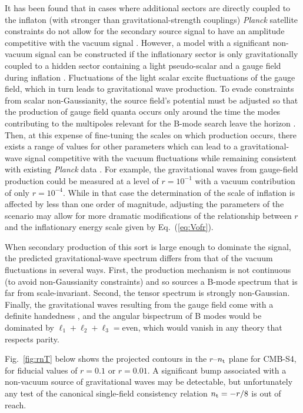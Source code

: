 It has been found that in cases where additional sectors are directly coupled to the inflaton (with stronger than gravitational-strength couplings) {\it Planck\/} satellite constraints do not allow for the secondary source signal to have an amplitude competitive with the vacuum signal \cite{Ozsoy:2014sba,Mirbabayi:2014jqa}. However, a model with a significant non-vacuum signal can be constructed if the inflationary sector is only gravitationally coupled to a hidden sector containing a light pseudo-scalar and a gauge field during inflation \cite{Barnaby:2012xt,Peloso:2016gqs}. Fluctuations of the light scalar excite fluctuations of the gauge field, which in turn leads to gravitational wave production. To evade constraints from scalar non-Gaussianity, the source field's potential must be adjusted so that the production of gauge field quanta occurs only around the time the modes contributing to the multipoles relevant for the B-mode search leave the horizon \cite{Namba:2015gja}. Then, at this expense of fine-tuning the scales on which production occurs, there exists a range of values for other parameters which can lead to a gravitational-wave signal competitive with the vacuum fluctuations while remaining consistent with existing {\it Planck\/} data \cite{Namba:2015gja,Peloso:2016gqs}. For example, the gravitational waves from gauge-field production could be measured at a level of $r=10^{-1}$ with a vacuum contribution of only $r=10^{-4}$. While in that case the determination of the scale of inflation is affected by less than one order of magnitude, adjusting the parameters of the scenario may allow for more dramatic modifications of the relationship between $r$ and the inflationary energy scale given by Eq.~(\ref{eq:Vofr}). 

When secondary production of this sort is large enough to dominate the signal, the predicted gravitational-wave spectrum differs from that of the vacuum fluctuations in several ways. First, the production mechanism is not continuous (to avoid non-Gaussianity constraints) and so sources a B-mode spectrum that is far from scale-invariant. Second, the tensor spectrum is strongly non-Gaussian. Finally, the gravitational waves resulting from the gauge field come with a definite handedness \cite{Anber:2006xt,Sorbo:2011rz}, and the angular bispectrum of B modes would be dominated by $\ell_1+\ell_2+\ell_3=$even, which would vanish in any theory that respects parity. 

Fig.~\ref{fig:rnT} below shows the projected contours in the $r$--$n_{\rm t}$ plane for CMB-S4, for fiducial values of $r=0.1$ or $r=0.01$. A significant bump associated with a non-vacuum source of gravitational waves may be detectable, but unfortunately any test of the canonical single-field consistency relation $n_{\rm t}=-r/8$ is out of reach. 

